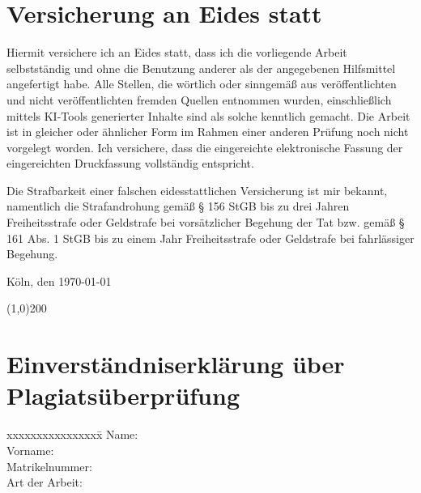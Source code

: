 \newcommand{\signature}{
	\vspace{25pt}
	\noindent Köln, den \numdate\today
	
	\vspace{25pt}
	\noindent \line(1,0){200}\\
	\noindent \thesisauthorfirstname{} \thesisauthorlastname
}

{}

{}
\renewcommand{\rightmark}{Declaration of Academic Honesty}
\section*{Versicherung an Eides statt}
\noindent Hiermit versichere ich an Eides statt, dass ich die vorliegende Arbeit selbstständig und ohne die Benutzung anderer als der angegebenen Hilfsmittel angefertigt habe. Alle Stellen, die wörtlich oder sinngemäß aus veröffentlichten und nicht veröffentlichten fremden Quellen entnommen wurden, einschließlich mittels KI-Tools generierter Inhalte sind als solche kenntlich gemacht. Die Arbeit ist in gleicher oder ähnlicher Form im Rahmen einer anderen Prüfung noch nicht vorgelegt worden. Ich versichere, dass die eingereichte elektronische Fassung der eingereichten Druckfassung vollständig entspricht.

Die Strafbarkeit einer falschen eidesstattlichen Versicherung ist mir bekannt, namentlich die Strafandrohung gemäß § 156 StGB bis zu drei Jahren Freiheitsstrafe oder Geldstrafe bei vorsätzlicher Begehung der Tat bzw. gemäß § 161 Abs. 1 StGB bis zu einem Jahr Freiheitsstrafe oder Geldstrafe bei fahrlässiger Begehung.

\signature




\newpage
{}
{}
\renewcommand{\rightmark}{Declaration of Consent for Plagiarism Checks}
\section*{Einverständniserklärung über Plagiatsüberprüfung}
\begin{tabbing} 
	xxxxxxxxxxxxxxxx\=\kill
	Name: \> \thesisauthorlastname\\
	Vorname: \> \thesisauthorfirstname\\
	Matrikelnummer: \> \studentID\\
	Art der Arbeit: \> \thesistype\\
\end{tabbing}

